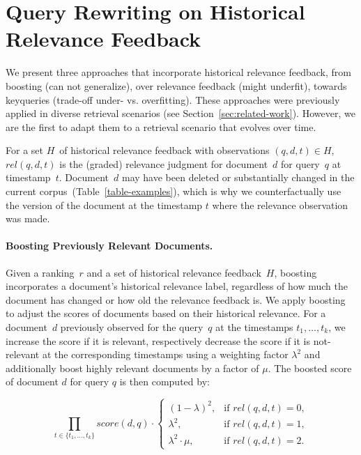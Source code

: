 \section{Query Rewriting on Historical Relevance Feedback}

We present three approaches that incorporate historical relevance feedback, from \Ni boosting (can not generalize), over \Nii relevance feedback (might underfit), towards \Niii keyqueries (trade-off under- vs. overfitting). These approaches were previously applied in diverse retrieval scenarios (see Section~\ref{sec:related-work}). However, we are the first to adapt them to a retrieval scenario that evolves over time.

For a set $H$~of historical relevance feedback with observations $(q, d, t) \in H$, $rel(q, d, t)$ is the (graded) relevance judgment for document~$d$ for query~$q$ at timestamp~$t$. Document~$d$ may have been deleted or substantially changed in the current corpus~(Table~\ref{table-examples}), which is why we counterfactually use the version of the document at the timestamp $t$ where the relevance observation was made.

\paragraph{Boosting Previously Relevant Documents.} Given a ranking~$r$ and a set of historical relevance feedback~$H$, boosting incorporates a document's historical relevance label, regardless of how much the document has changed or how old the relevance feedback is. We apply boosting to adjust the scores of documents based on their historical relevance. For a document~$d$ previously observed for the query~$q$ at the timestamps $t_{1}, \ldots, t_{k}$, we increase the score if it is relevant, respectively decrease the score if it is not-relevant at the corresponding timestamps using a weighting factor $\lambda^2$ and additionally boost highly relevant documents by a factor of $\mu$. The boosted score of document $d$ for query $q$ is then computed by:

\begin{equation}
    \prod\limits_{t \in \{t_{1}, \ldots, t_{k}\}} 
    score (d,q) \cdot
    \begin{cases}
        (1 - \lambda)^2, & \text{if } rel(q,d,t) = 0, \\
        \lambda^2, & \text{if } rel(q,d,t) = 1, \\
        \lambda^2 \cdot \mu, & \text{if } rel(q,d,t) = 2.
        \end{cases}
\end{equation}
    
